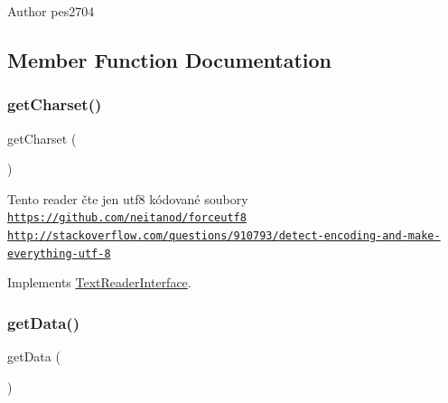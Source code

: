 \begin{DoxyAuthor}{Author}
pes2704 
\end{DoxyAuthor}


\subsection{Member Function Documentation}
\mbox{\label{class_pes_1_1_readers_1_1_text_file_reader_abca2d528da8311b6fcfe040768cbaa24}} 
\subsubsection{\texorpdfstring{get\+Charset()}{getCharset()}}
{\footnotesize\ttfamily get\+Charset (\begin{DoxyParamCaption}{ }\end{DoxyParamCaption})}

Tento reader čte jen utf8 kódované soubory \href{https://github.com/neitanod/forceutf8}{\tt https\+://github.\+com/neitanod/forceutf8} \href{http://stackoverflow.com/questions/910793/detect-encoding-and-make-everything-utf-8}{\tt http\+://stackoverflow.\+com/questions/910793/detect-\/encoding-\/and-\/make-\/everything-\/utf-\/8} 

Implements \mbox{\hyperlink{interface_pes_1_1_readers_1_1_text_reader_interface_abca2d528da8311b6fcfe040768cbaa24}{Text\+Reader\+Interface}}.

\mbox{\label{class_pes_1_1_readers_1_1_text_file_reader_a81a67162a6288d78fc4c55283325f0b4}} 
\subsubsection{\texorpdfstring{get\+Data()}{getData()}}
{\footnotesize\ttfamily get\+Data (\begin{DoxyParamCaption}{ }\end{DoxyParamCaption})}

